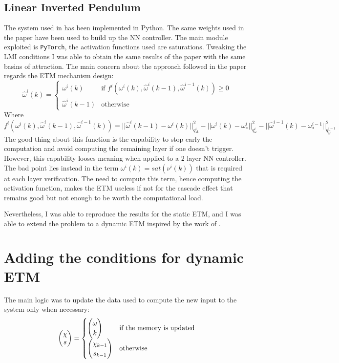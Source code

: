 \documentclass{article}
\begin{document}
\subsection*{Linear Inverted Pendulum}
The system used in \cite{css-paper} has been implemented in Python. The same weights used in the paper have been used to build up the NN controller. The main module exploited is \texttt{PyTorch}, the activation functions used are saturations. Tweaking the LMI conditions I was able to obtain the same results of the paper with the same basins of attraction.
The main concern about the approach followed in the paper regards the ETM mechanism design:
$$
  \hat{\omega}^{i}(k) = \begin{cases}
    \omega^{i}(k) & \text{if } f^{i}(\omega^{i}(k), \hat{\omega}^{i}(k-1), \hat{\omega}^{i-1}(k)) \geq 0\\
    \hat{\omega}^{i}(k-1) & \text{otherwise}  
  \end{cases}
$$
Where 
$$ 
f^{i}(\omega^{i}(k), \hat{\omega}^{i}(k-1), \hat{\omega}^{i-1}(k)) = ||\hat{\omega}^{i}(k-1) - \omega^{i}(k)||^{2}_{q^{i}_{\Delta}} - ||\omega^{i}(k) - \omega^{i}_*||^{2}_{q^{i}_{\omega}} - ||\hat{\omega}^{i-1}(k) - \omega^{i-1}_*||^{2}_{q^{i-1}_{\hat{\omega}}}
$$
The good thing about this function is the capability to stop early the computation and avoid computing the remaining layer if one doesn't trigger. However, this capability looses meaning when applied to a 2 layer NN controller. The bad point lies instead in the term $\omega^{i}(k) = sat(\nu^{i}(k))$ that is required at each layer verification. The need to compute this term, hence computing the activation function, makes the ETM useless if not for the cascade effect that remains good but not enough to be worth the computational load.

Nevertheless, I was able to reproduce the results for the static ETM, and I was able to extend the problem to a dynamic ETM inspired by the work of \cite{data-driven}.

\section*{Adding the conditions for dynamic ETM}
The main logic was to update the data used to compute the new input to the system only when necessary:
$$
  \left(\begin{matrix}\chi \\ s\end{matrix}\right) = \begin{cases}
    \left(\begin{matrix}\omega\\ k\end{matrix}\right) & \text{if the memory is updated}\\ 
    \left(\begin{matrix}\chi_{k-1} \\ s_{k-1}\end{matrix}\right) & \text{otherwise}
  \end{cases}
$$
\end{document}
